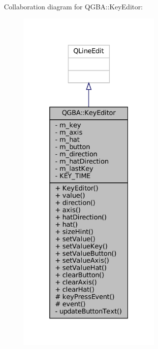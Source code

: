 Collaboration diagram for Q\+G\+BA\+:\+:Key\+Editor\+:
\nopagebreak
\begin{figure}[H]
\begin{center}
\leavevmode
\includegraphics[width=199pt]{class_q_g_b_a_1_1_key_editor__coll__graph}
\end{center}
\end{figure}
